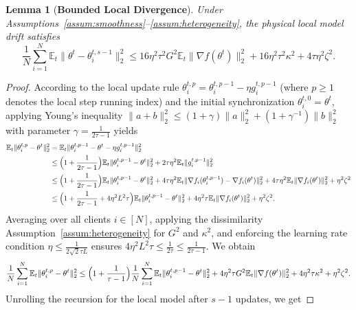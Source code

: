\documentclass[conference]{IEEEtran}
\newtheorem{lemma}{Lemma}
\begin{document}
\begin{lemma}[\bf Bounded Local Divergence] \label{lemma:local_div}
Under Assumptions~\ref{assum:smoothness}--\ref{assum:heterogeneity}, the physical local model drift satisfies
\begin{equation}
    \frac{1}{N} \sum_{i=1}^N \mathbb{E}_t \|\theta^t - \theta_i^{t,s-1}\|_2^2 \le 16\eta^2\tau^2 G^2 \mathbb{E}_t \|\nabla f(\theta^t)\|_2^2 + 16\eta^2\tau^2 \kappa^2 + 4\tau\eta^2 \zeta^2.
\end{equation}
\end{lemma}
\begin{proof}
According to the local update rule $\theta_i^{t,p} = \theta_i^{t,p-1} - \eta g_i^{t,p-1}$ (where $p \ge 1$ denotes the local step running index) and the initial synchronization $\theta_i^{t,0} = \theta^t$, applying Young's inequality $\|a+b\|_2^2 \le (1+\gamma)\|a\|_2^2 + (1+\gamma^{-1})\|b\|_2^2$ with parameter $\gamma = \frac{1}{2\tau-1}$ yields
\begin{align}
    \mathbb{E}_t\|\theta_i^{t,p} - \theta^t\|_2^2 &= \mathbb{E}_t\|\theta_i^{t,p-1} - \theta^t - \eta g_i^{t,p-1}\|_2^2 \notag \\
    &\le \Big(1+\frac{1}{2\tau-1}\Big)\mathbb{E}_t\|\theta_i^{t,p-1} - \theta^t\|_2^2 + 2\tau\eta^2\mathbb{E}_t\|g_i^{t,p-1}\|_2^2 \notag \\
    &\le \Big(1+\frac{1}{2\tau-1}\Big)\mathbb{E}_t\|\theta_i^{t,p-1} - \theta^t\|_2^2 + 4\tau\eta^2\mathbb{E}_t\|\nabla f_i(\theta_i^{t,p-1})-\nabla f_i(\theta^t)\|_2^2 + 4\tau\eta^2\mathbb{E}_t\|\nabla f_i(\theta^t)\|_2^2 + \eta^2\zeta^2 \notag \\
    &\le \Big(1+\frac{1}{2\tau-1} + 4\eta^2L^2\tau\Big)\mathbb{E}_t\|\theta_i^{t,p-1} - \theta^t\|_2^2 + 4\eta^2\tau\mathbb{E}_t\|\nabla f_i(\theta^t)\|_2^2 + \eta^2\zeta^2. \notag
\end{align}
Averaging over all clients $i \in [N]$, applying the dissimilarity Assumption~\ref{assum:heterogeneity} for $G^2$ and $\kappa^2$, and enforcing the learning rate condition $\eta \le \frac{1}{2\sqrt{2}\tau L}$ ensures $4\eta^2L^2\tau \le \frac{1}{2\tau} \le \frac{1}{2\tau-1}$. We obtain
\begin{equation}
    \frac{1}{N}\sum_{i=1}^N \mathbb{E}_t\|\theta_i^{t,p} - \theta^t\|_2^2 \le \Big(1+\frac{1}{\tau-1}\Big) \frac{1}{N}\sum_{i=1}^N \mathbb{E}_t\|\theta_i^{t,p-1} - \theta^t\|_2^2 + 4\eta^2\tau G^2\mathbb{E}_t\|\nabla f(\theta^t)\|_2^2 + 4\eta^2\tau\kappa^2 + \eta^2\zeta^2. \notag
\end{equation}
Unrolling the recursion for the local model after $s-1$ updates, we get

\end{proof}
\end{document}

